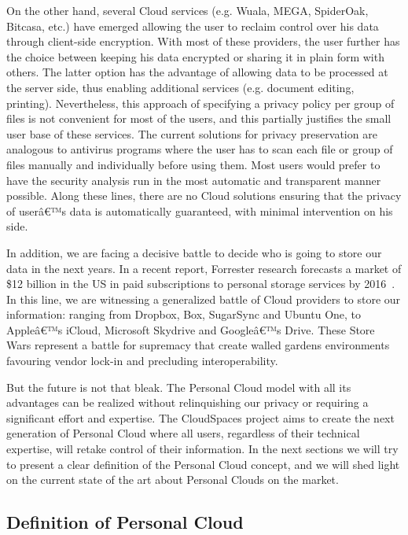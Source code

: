 On the other hand, several Cloud services (e.g. Wuala, MEGA, SpiderOak, Bitcasa, etc.) have emerged allowing the user to reclaim control over his data through client-side encryption. With most of these providers, the user further has the choice between keeping his data encrypted or sharing it in plain form with others. The latter option has the advantage of allowing data to be processed at the server side, thus enabling additional services (e.g. document editing, printing). Nevertheless, this approach of specifying a privacy policy per group of files is not convenient for most of the users, and this partially justifies the small user base of these services. The current solutions for privacy preservation are analogous to antivirus programs where the user has to scan each file or group of files manually and individually before using them. Most users would prefer to have the security analysis run in the most automatic and transparent manner possible. Along these lines, there are no Cloud solutions ensuring that the privacy of userâ€™s data is automatically guaranteed, with minimal intervention on his side.


In addition, we are facing a decisive battle to decide who is going to store our data in the next years.  In a recent report, Forrester research forecasts a market of \$12 billion in the US in paid subscriptions to personal storage services by 2016~\cite{forrester}. In this line, we are witnessing a generalized battle of Cloud providers to store our information: ranging from Dropbox, Box, SugarSync and Ubuntu One, to Appleâ€™s iCloud, Microsoft Skydrive and Googleâ€™s Drive. These Store Wars represent  a battle for supremacy that create walled gardens environments favouring vendor lock-in and precluding interoperability.


But the future is not that bleak. The Personal Cloud model with all its advantages can be realized without relinquishing our privacy or requiring a significant effort and expertise.  The CloudSpaces project aims to create the next generation of Personal Cloud where all users, regardless of their technical expertise, will retake control of their information. In the next sections we will try to present a clear definition of the Personal Cloud concept, and we will shed light on the current state of the art about Personal Clouds on the market.



\subsection{Definition of Personal Cloud}

